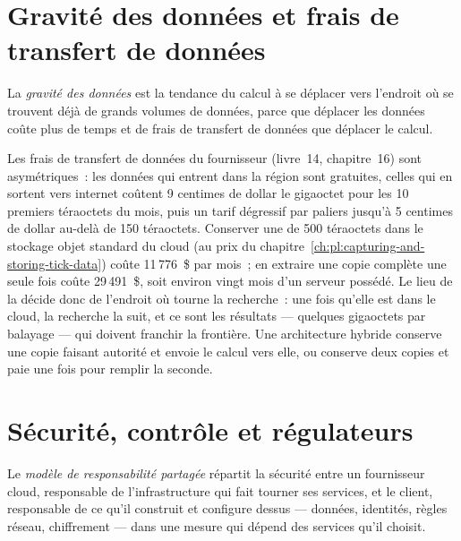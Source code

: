 \section{Gravité des données et frais de transfert de données}

\begin{definition}\label{def:pl:cloud-against-on-premises:gravity}
La \emph{gravité des données} est la tendance du calcul à se déplacer vers l'endroit où se trouvent déjà de grands volumes de données, parce que déplacer les données coûte
plus de temps et de frais de transfert de données que déplacer le calcul.
\end{definition}

Les frais de transfert de données du fournisseur (livre~14, chapitre~16) sont asymétriques~: les données qui entrent dans la région sont gratuites, celles qui en sortent vers internet
coûtent 9 centimes de dollar le gigaoctet pour les 10 premiers téraoctets du mois, puis un tarif dégressif par paliers jusqu'à 5 centimes de dollar au-delà de 150 téraoctets. Conserver une  de 500 téraoctets
dans le stockage objet standard du cloud (au prix du chapitre~\ref{ch:pl:capturing-and-storing-tick-data}) coûte 11\,776~\$ par mois~; en extraire
une copie complète une seule fois coûte 29\,491~\$, soit environ vingt mois d'un serveur possédé. Le lieu de la  décide donc de l'endroit où tourne la recherche~: une fois
qu'elle est dans le cloud, la recherche la suit, et ce sont les résultats --- quelques gigaoctets par balayage --- qui doivent franchir la frontière. Une architecture hybride conserve
une copie faisant autorité et envoie le calcul vers elle, ou conserve deux copies et paie une fois pour remplir la seconde.

\section{Sécurité, contrôle et régulateurs}

\begin{definition}\label{def:pl:cloud-against-on-premises:shared}
Le \emph{modèle de responsabilité partagée} répartit la sécurité entre un fournisseur cloud, responsable de
l'infrastructure qui fait tourner ses services, et le client, responsable de ce qu'il construit et configure dessus --- données, identités, règles
réseau, chiffrement --- dans une mesure qui dépend des services qu'il choisit.
\end{definition}

